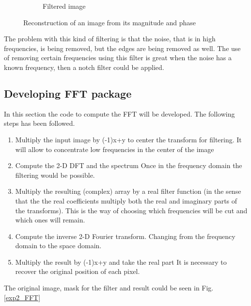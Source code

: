 \documentclass[a4paper, 10pt, conference] {article}
\begin{document}
\begin{figure}[H]
\begin{subfigure}{0.32\textwidth}
		\caption{Filtered image}
	\end{subfigure}
	\caption{Reconstruction of an image from its magnitude and phase}
	\label{exp2_lowPass}
\end{figure} 
 The problem with this kind of filtering is that the noise, that is in high frequencies, is being removed, but the edges are being removed as well. The use of removing certain frequencies using this filter is great when the noise has a known frequency, then a notch filter could be applied. 
 
\subsection{Developing FFT package}
 In this section  the code to compute the FFT will be developed. The following steps has been followed.
 \begin{enumerate}
 	\item{Multiply the input image by (-1)x+y to center the transform for filtering}. It will allow to concentrate low frequencies in the center of the image
 	\item{Compute the 2-D DFT and  the spectrum} Once in the frequency domain the filtering would be possible.
 	\item{Multiply the resulting (complex) array by a real filter function (in the sense that the the real coefficients multiply both the real and imaginary parts of the transforms).} This is the way of choosing which frequencies will be cut and which ones will remain.
 	\item{Compute the inverse 2-D Fourier transform.} Changing from the frequency domain to the space domain.
 	\item{Multiply the result by (-1)x+y and take the real part} It is necessary to recover the original position of each pixel. 
 \end{enumerate}
 The original image, mask for the filter and result could be seen in Fig.\ref{exp2_FFT}
\end{document}
